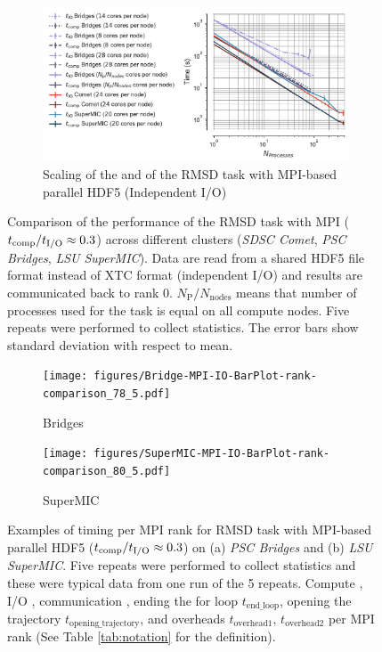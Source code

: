 \begin{figure}[ht!]
\begin{subfigure} {.8\textwidth}
  \includegraphics[width=\linewidth]{figures/Clusters_IO_compute_scaling.pdf}
  \captionsetup{format=hang}
  \caption{Scaling of the \tcomp and \tIO of the RMSD task with MPI-based parallel HDF5 (Independent I/O)}
  \label{fig:compute-IO-scaling-clusters}
\end{subfigure}
%
\caption{Comparison of the performance of the RMSD task with MPI (${t}_{\text{comp}}/{t}_{\text{I/O}} \approx 0.3$)
across different clusters (\emph{SDSC Comet}, \emph{PSC Bridges}, \emph{LSU SuperMIC}). Data are read from a shared HDF5 file format instead of XTC format (independent I/O)
and results are communicated back to rank 0. $N_{\text{P}}/N_{\text{nodes}}$ means that number of processes used for the task is equal on all compute nodes.
Five repeats were performed to 
collect statistics. The error bars show standard deviation with respect to mean.}
\label{fig:MPIwithIO-clusters}
\end{figure} 

\begin{figure}[ht!]
\centering
\begin{subfigure}{.45\textwidth}
  \texttt{[image: figures/Bridge-MPI-IO-BarPlot-rank-comparison\_78\_5.pdf]}
  \caption{Bridges}
  \label{fig:hdf5-bridge}
\end{subfigure}
\bigskip
\begin{subfigure} {.45\textwidth}
  \texttt{[image: figures/SuperMIC-MPI-IO-BarPlot-rank-comparison\_80\_5.pdf]}
  \caption{SuperMIC}
  \label{fig:hdf5-SuperMIC}
\end{subfigure}
%
\caption{Examples of timing per MPI rank for RMSD task with MPI-based parallel HDF5 (${t}_{\text{comp}}/{t}_{\text{I/O}} \approx 0.3$) on (a) \emph{PSC Bridges} and (b) \emph{LSU SuperMIC}.
Five repeats were performed to collect statistics and these were typical data from one run of the 5 repeats. Compute \tcomp, I/O \tIO, communication \tcomm, ending the for loop $t_{\text{end\_loop}}$,
  opening the trajectory $t_{\text{opening\_trajectory}}$, and overheads $t_{\text{overhead1}}$, $t_{\text{overhead2}}$ per MPI rank (See Table \ref{tab:notation} for the definition).}
\label{fig:MPIwithIO-clusters-rank}
\end{figure} 

